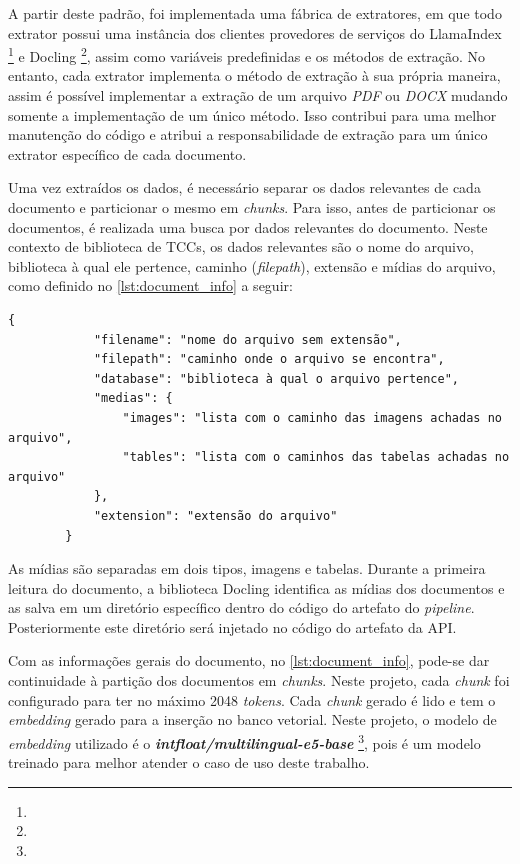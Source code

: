 \documentclass[a4paper, 12pt]{article}
\begin{document}
    A partir deste padrão, foi implementada uma fábrica de extratores, em que todo extrator possui uma instância dos clientes provedores de serviços do LlamaIndex \footnote{} e Docling \footnote{}, assim como variáveis predefinidas e os métodos de extração. No entanto, cada extrator implementa o método de extração à sua própria maneira, assim é possível implementar a extração de um arquivo \textit{PDF} ou \textit{DOCX} mudando somente a implementação de um único método. Isso contribui para uma melhor manutenção do código e atribui a responsabilidade de extração para um único extrator específico de cada documento.

    Uma vez extraídos os dados, é necessário separar os dados relevantes de cada documento e particionar o mesmo em \textit{chunks}. Para isso, antes de particionar os documentos, é realizada uma busca por dados relevantes do documento. Neste contexto de biblioteca de TCCs, os dados relevantes são o nome do arquivo, biblioteca à qual ele pertence, caminho (\textit{filepath}), extensão e mídias do arquivo, como definido no \autoref{lst:document_info} a seguir:
    
    \begin{lstlisting}[caption={Objeto com dados mais superficiais do documento.}, label={lst:document_info}]
        {
            "filename": "nome do arquivo sem extensão",
            "filepath": "caminho onde o arquivo se encontra",
            "database": "biblioteca à qual o arquivo pertence",
            "medias": {
                "images": "lista com o caminho das imagens achadas no arquivo",
                "tables": "lista com o caminhos das tabelas achadas no arquivo"
            },
            "extension": "extensão do arquivo"
        }
    \end{lstlisting}
    
    As mídias são separadas em dois tipos, imagens e tabelas. Durante a primeira leitura do documento, a biblioteca Docling identifica as mídias dos documentos e as salva em um diretório específico dentro do código do artefato do \textit{pipeline}. Posteriormente este diretório será injetado no código do artefato da API.

    Com as informações gerais do documento, no \autoref{lst:document_info}, pode-se dar continuidade à partição dos documentos em \textit{chunks}. Neste projeto, cada \textit{chunk} foi configurado para ter no máximo 2048 \textit{tokens}. Cada \textit{chunk} gerado é lido e tem o \textit{embedding} gerado para a inserção no banco vetorial. Neste projeto, o modelo de \textit{embedding} utilizado é o \textit{\textbf{intfloat/multilingual-e5-base}} \footnote{}, pois é um modelo treinado para melhor atender o caso de uso deste trabalho.
    
\end{document}
